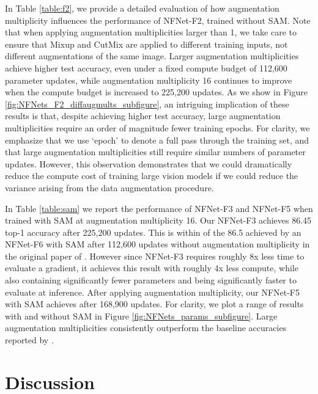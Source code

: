 \documentclass{article}
\begin{document}
In Table \ref{table:f2}, we provide a detailed evaluation of how augmentation multiplicity influences the performance of NFNet-F2, trained without SAM. Note that when applying augmentation multiplicities larger than 1, we take care to ensure that Mixup and CutMix are applied to different training inputs, not different augmentations of the same image. Larger augmentation multiplicities achieve higher test accuracy, even under a fixed compute budget of 112,600 parameter updates, while augmentation multiplicity 16 continues to improve when the compute budget is increased to 225,200 updates. As we show in Figure \ref{fig:NFNets_F2_diffaugmults_subfigure}, an intriguing implication of these results is that, despite achieving higher test accuracy, large augmentation multiplicities require an order of magnitude fewer training epochs. For clarity, we emphasize that we use `epoch' to denote a full pass through the training set, and that large augmentation multiplicities still require similar numbers of parameter updates. However, this observation demonstrates that we could dramatically reduce the compute cost of training large vision models if we could reduce the variance arising from the data augmentation procedure.

In Table \ref{table:sam} we report the performance of NFNet-F3 and NFNet-F5 when trained with SAM \citep{foret2020sharpness} at augmentation multiplicity 16. Our NFNet-F3 achieves 86.45 top-1 accuracy after 225,200 updates. This is within  of the 86.5 achieved by an NFNet-F6 with SAM after 112,600 updates without augmentation multiplicity in the original paper of \citet{brock2021high}. However since NFNet-F3 requires roughly 8x less time to evaluate a gradient, it achieves this result with roughly 4x less compute, while also containing significantly fewer parameters and being significantly faster to evaluate at inference. After applying augmentation multiplicity, our NFNet-F5 with SAM achieves  after 168,900 updates. For clarity, we plot a range of results with and without SAM in Figure \ref{fig:NFNets_params_subfigure}. Large augmentation multiplicities consistently outperform the baseline accuracies reported by \citet{brock2021high}.





\section{Discussion}
\label{sec:discussion}
\end{document}
